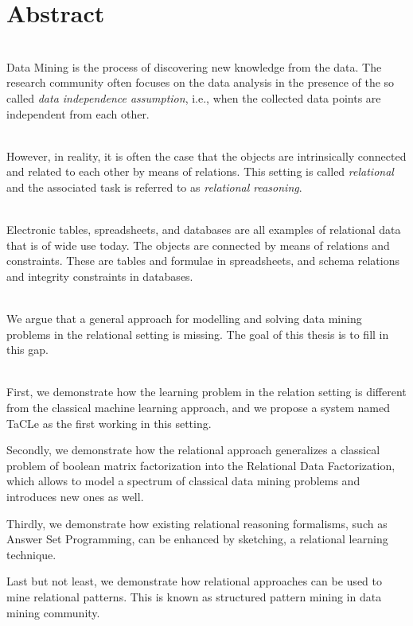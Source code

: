 \chapter{Abstract} \label{ch:abstract}
\\
Data Mining is the process of discovering new knowledge from the data.
The research community often focuses on the data
analysis in the presence of the so called \textit{data independence assumption}, i.e.,
when the collected data points are independent from each other.

\\
However, in reality, it is often the case that the objects are 
intrinsically connected and related to each other by means of relations. 
This setting is called \textit{relational} and the associated task 
is referred to as \textit{relational reasoning}.

\\
Electronic tables, spreadsheets, and databases are all examples of
relational data that is of wide use today. The objects are connected
by means of relations and constraints. These are
tables and formulae in spreadsheets, and  schema relations and integrity
constraints in databases.

\\
We argue that a general approach for modelling and solving data mining  
problems in the relational setting is missing. The goal of this thesis
is to fill in this gap.


\\
First, we demonstrate how the learning problem in the relation
setting is different from the classical machine learning approach, and we
propose a system named TaCLe as the first working in this setting.

Secondly, we demonstrate how the relational approach generalizes a
classical problem of boolean matrix factorization into the Relational
Data Factorization, which allows to model a spectrum of classical data
mining problems and introduces new ones as well.

Thirdly, we demonstrate how existing relational reasoning formalisms,
such as Answer Set Programming, can be enhanced by sketching, a relational learning
technique.

Last but not least, we demonstrate how relational approaches can be used
to mine relational patterns. This is known as structured pattern mining in
data mining community.


\cleardoublepage

